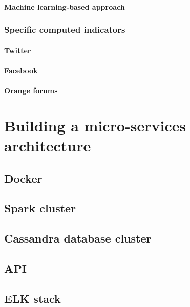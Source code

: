 \documentclass[11pt]{article}
\begin{document}
\paragraph{Machine learning-based approach}

\subsubsection{Specific computed indicators}

\paragraph{Twitter}

\paragraph{Facebook}

\paragraph{Orange forums}

\section{Building a micro-services architecture}


\subsection{Docker}

\subsection{Spark cluster}

\subsection{Cassandra database cluster}

\subsection{API}

\subsection{ELK stack}
\end{document}
